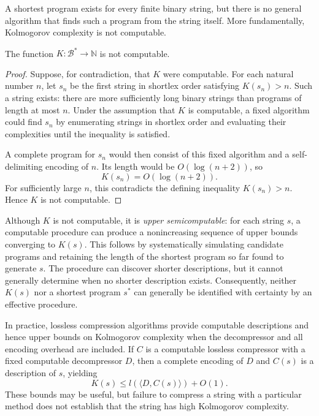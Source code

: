 A shortest program exists for every finite binary string, but there is no general algorithm that finds such a program from the string itself. More fundamentally, Kolmogorov complexity is not computable.

\begin{theorem}
\label{th:Kolmogorov-noncomputability}
The function $K:\mathcal{B}^*\rightarrow\mathbb{N}$ is not computable.
\end{theorem}
\begin{proof}
Suppose, for contradiction, that $K$ were computable. For each natural number $n$, let $s_n$ be the first string in shortlex order satisfying $K(s_n)>n$. Such a string exists: there are more sufficiently long binary strings than programs of length at most $n$. Under the assumption that $K$ is computable, a fixed algorithm could find $s_n$ by enumerating strings in shortlex order and evaluating their complexities until the inequality is satisfied.

A complete program for $s_n$ would then consist of this fixed algorithm and a self-delimiting encoding of $n$. Its length would be $O(\log(n+2))$, so
\[
K(s_n)=O(\log(n+2)).
\]
For sufficiently large $n$, this contradicts the defining inequality $K(s_n)>n$. Hence $K$ is not computable.
\end{proof}

Although $K$ is not computable, it is \emph{upper semicomputable}: for each string $s$, a computable procedure can produce a nonincreasing sequence of upper bounds converging to $K(s)$. This follows by systematically simulating candidate programs and retaining the length of the shortest program so far found to generate $s$. The procedure can discover shorter descriptions, but it cannot generally determine when no shorter description exists. Consequently, neither $K(s)$ nor a shortest program $s^*$ can generally be identified with certainty by an effective procedure.

In practice, lossless compression algorithms provide computable descriptions and hence upper bounds on Kolmogorov complexity when the decompressor and all encoding overhead are included. If $C$ is a computable lossless compressor with a fixed computable decompressor $D$, then a complete encoding of $D$ and $C(s)$ is a description of $s$, yielding
\[
K(s)\leq l(\langle D,C(s)\rangle)+O(1).
\]
These bounds may be useful, but failure to compress a string with a particular method does not establish that the string has high Kolmogorov complexity.

